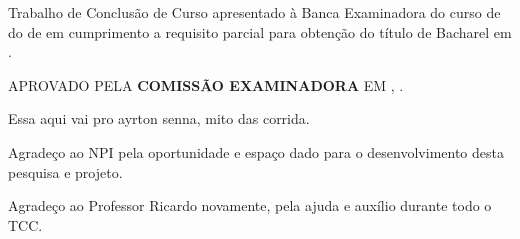 \documentclass[12pt,openright,oneside,a4paper,english,french,spanish,brazil]{unifil}
\begin{document}
\begin{folhadeaprovacao}
	\begin{center}
		\ABNTEXchapterfont\textbf{\MakeTextUppercase{\imprimirautor}}
		\vspace*{2cm}
		\begin{center}
			\ABNTEXchapterfont\large\textbf{\MakeTextUppercase{\imprimirtitulo}}
		\end{center}
		\vspace*{2cm}
		Trabalho de Conclusão de Curso apresentado à Banca Examinadora do curso de \imprimirpreambulo{} do \imprimirinstituicao{} de \imprimirlocal{} em cumprimento a requisito parcial para obtenção do título de Bacharel em \imprimirpreambulo.
		\par
		\vspace*{.5in}
		\hspace{.6\textwidth}
		\begin{minipage}{.6\textwidth}
			\begin{center}
\MakeTextUppercase{Aprovado pela \textbf{COMISSÃO EXAMINADORA} em \imprimirlocal, \imprimirdata.}
			\end{center}
		\end{minipage}
			\vspace*{\fill}
	\end{center}
\end{folhadeaprovacao}


\begin{epigrafe}
\vspace*{\fill}
\begin{flushright}
Essa aqui vai pro ayrton senna, mito das corrida.
\end{flushright}
\end{epigrafe} 


\begin{agradecimentos}

Agradeço ao NPI pela oportunidade e espaço dado para o desenvolvimento desta pesquisa e projeto.

Agradeço ao Professor Ricardo novamente, pela ajuda e auxílio durante todo o TCC.
\end{agradecimentos}

\end{document}
